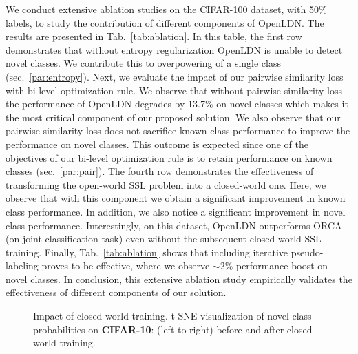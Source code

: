 \documentclass[runningheads]{eccv2022submission}
\begin{document}
We conduct extensive ablation studies on the CIFAR-100 dataset, with 50\% labels, to study the contribution of different components of OpenLDN. The results are presented in Tab.~\ref{tab:ablation}. In this table, the first row demonstrates that without entropy regularization OpenLDN is unable to detect novel classes. We contribute this to overpowering of a single class (sec.~\ref{par:entropy}). Next, we evaluate the impact of our pairwise similarity loss with bi-level optimization rule. We observe that without pairwise similarity loss the performance of OpenLDN degrades by 13.7\% on novel classes which makes it the most critical component of our proposed solution. We also observe that our pairwise similarity loss does not sacrifice known class performance to improve the performance on novel classes. This outcome is expected since one of the objectives of our bi-level optimization rule is to retain performance on known classes (sec.~\ref{par:pair}). The fourth row demonstrates the effectiveness of transforming the open-world SSL problem into a closed-world one. Here, we observe that with this component we obtain a significant improvement in known class performance. In addition, we also notice a significant improvement in novel class performance. Interestingly, on this dataset, OpenLDN outperforms ORCA~\cite{cao2022openworld} (on joint classification task) even without the subsequent closed-world SSL training. Finally, Tab.~\ref{tab:ablation} shows that including iterative pseudo-labeling proves to be effective, where we observe $\sim$2\% performance boost on novel classes. In conclusion, this extensive ablation study empirically validates the effectiveness of different components of our solution.   

\begin{figure}[t]
\captionsetup[subfloat]{labelformat=empty}
\vspace{-2mm}
    \centering
    \qquad


    \vspace{-6mm}
    \caption{\small Impact of closed-world training. t-SNE visualization of novel class probabilities on \textbf{CIFAR-10}: (left to right) before and after closed-world training.  
}
    \label{fig:tsne}\vspace{-6mm}
\end{figure}
\end{document}
